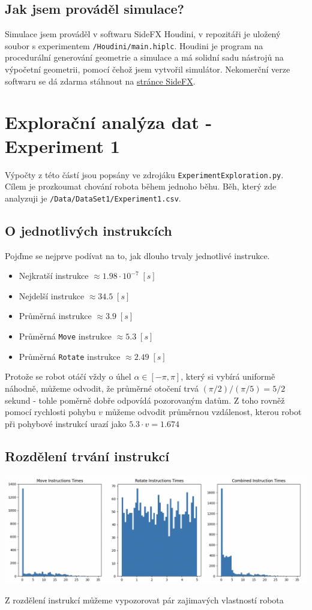 \documentclass[11pt]{article}
\def\code#1{\texttt{#1}}
\begin{document}
\subsection{Jak jsem prováděl simulace?} Simulace jsem prováděl v softwaru SideFX Houdini, v repozitáři je uložený soubor s experimentem \code{/Houdini/main.hiplc}. Houdini je program na procedurální generování geometrie a simulace a má solidní sadu nástrojů na výpočetní geometrii, pomocí čehož jsem vytvořil simulátor. Nekomerční verze softwaru se dá zdarma stáhnout na \href{http://www.sidefx.com}{stránce SideFX}.

\section{Explorační analýza dat - Experiment 1}
Výpočty z této částí jsou popsány ve zdrojáku \code{ExperimentExploration.py}. Cílem je prozkoumat chování robota během jednoho běhu. Běh, který zde analyzuji je \code{/Data/DataSet1/Experiment1.csv}.

\subsection{O jednotlivých instrukcích}
Pojďme se nejprve podívat na to, jak dlouho trvaly jednotlivé instrukce.
\begin{itemize}
	\item Nejkratší instrukce $\approx 1.98\cdot 10^{-7} \;[s]$
	\item Nejdelší instrukce $\approx 34.5\;[s]$
	\item Průměrná instrukce $\approx 3.9 \;[s]$
	\item Průměrná \code{Move} instrukce $\approx 5.3 \;[s]$
	\item Průměrná \code{Rotate} instrukce $\approx 2.49 \;[s]$
\end{itemize}
Protože se robot otáčí vždy o úhel $\alpha\in [-\pi,\pi]$, který si vybírá uniformě náhodně, můžeme odvodit, že průměrné otočení trvá $(\pi/2)/(\pi/5)=5/2$ sekund - tohle poměrně dobře odpovídá pozorovaným datům.
Z toho rovněž pomocí rychlosti pohybu $v$ můžeme odvodit průměrnou vzdálenost, kterou robot při pohybové instrukcí urazí jako $5.3\cdot v=1.674$

\subsection{Rozdělení trvání instrukcí}
\begin{center}
	\includegraphics[scale=0.35]{Images/Section32_2.png}
\end{center}
Z rozdělení instrukcí můžeme vypozorovat pár zajimavých vlastností robota
\end{document}
